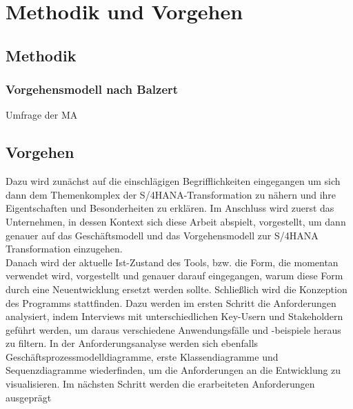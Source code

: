 \section{Methodik und Vorgehen}
\subsection{Methodik}
\subsubsection{Vorgehensmodell nach Balzert}
Umfrage der MA
\subsection{Vorgehen}
Dazu wird zunächst auf die einschlägigen Begrifflichkeiten eingegangen um sich dann dem Themenkomplex der S/4HANA-Transformation zu nähern und ihre Eigentschaften und Besonderheiten zu erklären. Im Anschluss wird zuerst das Unternehmen, in dessen Kontext sich diese Arbeit abspielt, vorgestellt, um dann genauer auf das Geschäftsmodell und das Vorgehensmodell zur S/4HANA Transformation einzugehen. \\
Danach wird der aktuelle Ist-Zustand des Tools, bzw. die Form, die momentan verwendet wird, vorgestellt und genauer darauf eingegangen, warum diese Form durch eine Neuentwicklung ersetzt werden sollte. Schließlich wird die Konzeption des Programms stattfinden. Dazu werden im ersten Schritt die Anforderungen analysiert, indem Interviews mit unterschiedlichen Key-Usern und Stakeholdern geführt werden, um daraus verschiedene Anwendungsfälle und -beispiele heraus zu filtern. In der Anforderungsanalyse werden sich ebenfalls Geschäftsprozessmodelldiagramme, erste Klassendiagramme und Sequenzdiagramme wiederfinden, um die Anforderungen an die Entwicklung zu visualisieren. Im nächsten Schritt werden die erarbeiteten Anforderungen ausgeprägt
